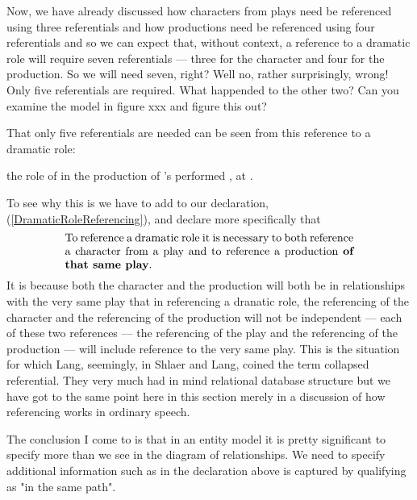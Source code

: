 Now, we have already discussed how characters from plays need be referenced using three referentials
and  how productions need be referenced using four referentials 
and so we can expect that, without context, a reference to
a dramatic role will require seven referentials
 --- three for the character and four for the production. 
So we will need seven, right?
 Well no, rather surprisingly, wrong! Only five referentials are required. 
 What happended to the other two? Can you examine the model in figure xxx and figure this out?

That only five referentials are needed can be seen from this reference to a dramatic role:
\begin{erquote}
\parbox{9.0cm}{the role of  in the production of \mbox{'s}  performed \mbox{,} at .
}
\end{erquote}

To see why this is we have to add to our declaration, (\ref{DramaticRoleReferencing}), and declare more specifically that
\begin{equation}
\label{DramaticRoleReferencingRevised}
\text{\parbox{9cm}{To reference a dramatic role it is necessary 
to both reference a character from a play and to reference a production \textbf{of that same play}.}}
\end{equation}
It is because both the character and the production will both be in relationships with the very same play
that in referencing a dranatic role, the referencing of the character and the referencing of
the production will not be independent
--- each of these two references --- the referencing of the play and the referencing of the production ---
 will include reference to the very same play. This is the situation for which Lang, seemingly, in Shlaer and Lang, coined the term collapsed referential. They very much had in mind relational database structure but we have got to the same point here in this section merely in a discussion of how referencing works in ordinary speech. 

 The conclusion I come to is that in an entity model it is pretty significant to specify more than we see in the diagram of relationships. We need to specify additional information such as in the declaration above
 is captured by qualifying as "in the same path". 

